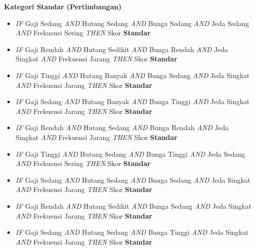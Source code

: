 \documentclass[12pt,a4paper]{report}
\begin{document}
\vspace{4pt}
\noindent\textbf{Kategori Standar (Pertimbangan)}
\begin{itemize}
  \item[R05] \textit{IF} Gaji Sedang \textit{AND} Hutang Sedang \textit{AND} Bunga Sedang \textit{AND} Jeda Sedang \textit{AND} Frekuensi Sering \textit{THEN} Skor \textbf{Standar}
  \item[R06] \textit{IF} Gaji Rendah \textit{AND} Hutang Sedikit \textit{AND} Bunga Rendah \textit{AND} Jeda Singkat \textit{AND} Frekuensi Jarang \textit{THEN} Skor \textbf{Standar}
  \item[R07] \textit{IF} Gaji Tinggi \textit{AND} Hutang Banyak \textit{AND} Bunga Sedang \textit{AND} Jeda Singkat \textit{AND} Frekuensi Jarang \textit{THEN} Skor \textbf{Standar}
  \item[R08] \textit{IF} Gaji Sedang \textit{AND} Hutang Banyak \textit{AND} Bunga Tinggi \textit{AND} Jeda Singkat \textit{AND} Frekuensi Jarang \textit{THEN} Skor \textbf{Standar}
  \item[R09] \textit{IF} Gaji Rendah \textit{AND} Hutang Sedang \textit{AND} Bunga Rendah \textit{AND} Jeda Singkat \textit{AND} Frekuensi Jarang \textit{THEN} Skor \textbf{Standar}
  \item[R10] \textit{IF} Gaji Tinggi \textit{AND} Hutang Sedang \textit{AND} Bunga Tinggi \textit{AND} Jeda Sedang \textit{AND} Frekuensi Sering \textit{THEN} Skor \textbf{Standar}
  \item[R18] \textit{IF} Gaji Sedang \textit{AND} Hutang Sedang \textit{AND} Bunga Sedang \textit{AND} Jeda Singkat \textit{AND} Frekuensi Jarang \textit{THEN} Skor \textbf{Standar}
  \item[R19] \textit{IF} Gaji Rendah \textit{AND} Hutang Sedikit \textit{AND} Bunga Sedang \textit{AND} Jeda Singkat \textit{AND} Frekuensi Jarang \textit{THEN} Skor \textbf{Standar}
  \item[R20] \textit{IF} Gaji Sedang \textit{AND} Hutang Sedang \textit{AND} Bunga Tinggi \textit{AND} Jeda Singkat \textit{AND} Frekuensi Jarang \textit{THEN} Skor \textbf{Standar}
\end{itemize}
\end{document}
